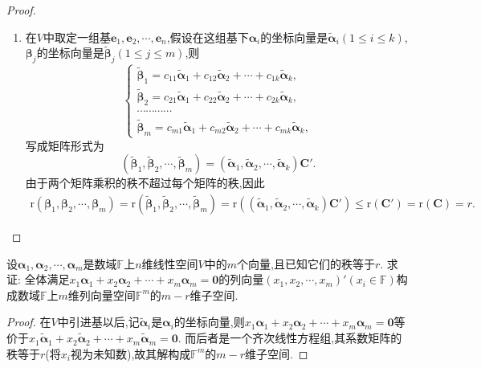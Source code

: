\documentclass[../../main.tex]{subfiles}%
\begin{document}
\begin{proof}
\begin{enumerate}[(1)]
\item 在\(V\)中取定一组基\(\boldsymbol{e}_1,\boldsymbol{e}_2,\cdots,\boldsymbol{e}_n\),假设在这组基下\(\boldsymbol{\alpha}_i\)的坐标向量是\(\widetilde{\boldsymbol{\alpha}}_i(1\leqslant  i\leqslant  k)\),\(\boldsymbol{\beta}_j\)的坐标向量是\(\widetilde{\boldsymbol{\beta}}_j(1\leqslant  j\leqslant  m)\),则
\[
\begin{cases}
\widetilde{\boldsymbol{\beta}}_1 = c_{11}\widetilde{\boldsymbol{\alpha}}_1 + c_{12}\widetilde{\boldsymbol{\alpha}}_2+\cdots + c_{1k}\widetilde{\boldsymbol{\alpha}}_k,\\
\widetilde{\boldsymbol{\beta}}_2 = c_{21}\widetilde{\boldsymbol{\alpha}}_1 + c_{22}\widetilde{\boldsymbol{\alpha}}_2+\cdots + c_{2k}\widetilde{\boldsymbol{\alpha}}_k,\\
\cdots\cdots\cdots\cdots\\
\widetilde{\boldsymbol{\beta}}_m = c_{m1}\widetilde{\boldsymbol{\alpha}}_1 + c_{m2}\widetilde{\boldsymbol{\alpha}}_2+\cdots + c_{mk}\widetilde{\boldsymbol{\alpha}}_k,
\end{cases}
\]
写成矩阵形式为
\[
(\widetilde{\boldsymbol{\beta}}_1,\widetilde{\boldsymbol{\beta}}_2,\cdots,\widetilde{\boldsymbol{\beta}}_m)=(\widetilde{\boldsymbol{\alpha}}_1,\widetilde{\boldsymbol{\alpha}}_2,\cdots,\widetilde{\boldsymbol{\alpha}}_k)\boldsymbol{C}'.
\]
由于两个矩阵乘积的秩不超过每个矩阵的秩,因此
\begin{align*}
\mathrm{r}\left( \boldsymbol{\beta }_1,\boldsymbol{\beta }_2,\cdots ,\boldsymbol{\beta }_m \right) =\mathrm{r}\left( \widetilde{\boldsymbol{\beta }}_1,\widetilde{\boldsymbol{\beta }}_2,\cdots ,\widetilde{\boldsymbol{\beta }}_m \right) =\mathrm{r}\left( \left( \widetilde{\boldsymbol{\alpha }}_1,\widetilde{\boldsymbol{\alpha }}_2,\cdots ,\widetilde{\boldsymbol{\alpha }}_k \right) \boldsymbol{C}' \right) \leqslant \mathrm{r}\left( \boldsymbol{C}'\right) =\mathrm{r}\left( \boldsymbol{C} \right) =r.
\end{align*}
\end{enumerate}
\end{proof}

\begin{proposition}\label{proposition:向量方程的解空间}
设\(\boldsymbol{\alpha}_1,\boldsymbol{\alpha}_2,\cdots,\boldsymbol{\alpha}_m\)是数域\(\mathbb{F}\)上\(n\)维线性空间\(V\)中的\(m\)个向量,且已知它们的秩等于\(r\). 求证: 全体满足\(x_1\boldsymbol{\alpha}_1 + x_2\boldsymbol{\alpha}_2+\cdots + x_m\boldsymbol{\alpha}_m = \boldsymbol{0}\)的列向量\((x_1,x_2,\cdots,x_m)'(x_i\in\mathbb{F})\)构成数域\(\mathbb{F}\)上\(m\)维列向量空间\(\mathbb{F}^m\)的\(m - r\)维子空间.
\end{proposition}
\begin{proof}
在\(V\)中引进基以后,记\(\widetilde{\boldsymbol{\alpha}}_i\)是\(\boldsymbol{\alpha}_i\)的坐标向量,则\(x_1\boldsymbol{\alpha}_1 + x_2\boldsymbol{\alpha}_2+\cdots + x_m\boldsymbol{\alpha}_m = \boldsymbol{0}\)等价于\(x_1\widetilde{\boldsymbol{\alpha}}_1 + x_2\widetilde{\boldsymbol{\alpha}}_2+\cdots + x_m\widetilde{\boldsymbol{\alpha}}_m = \boldsymbol{0}\). 而后者是一个齐次线性方程组,其系数矩阵的秩等于\(r\)(将\(x_i\)视为未知数),故其解构成\(\mathbb{F}^m\)的\(m - r\)维子空间.
\end{proof}
\end{document}
